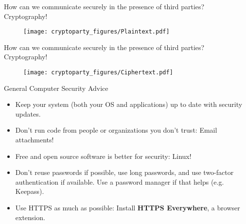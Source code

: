\documentclass{beamer}
\begin{document}
\begin{frame}{How can we communicate securely in the presence of third parties? Cryptography!}

\begin{figure}
\centering
\texttt{[image: cryptoparty\_figures/Plaintext.pdf]}
\end{figure}

\end{frame}
\begin{frame}{How can we communicate securely in the presence of third parties? Cryptography!}

\begin{figure}
\centering
\texttt{[image: cryptoparty\_figures/Ciphertext.pdf]}
\end{figure}

\end{frame}

\begin{frame}{General Computer Security Advice}

\begin{itemize}
   \item<1-> Keep your system (both your OS and applications) up to date with security updates.
   \item<2-> Don't run code from people or organizations you don't trust: Email attachments!
   \item<3-> Free and open source software is better for security: Linux!
   \item<4-> Don't reuse passwords if possible, use long passwords, and use two-factor authentication if available. Use a password manager if that helps (e.g. Keepass).
   \item<5-> Use HTTPS as much as possible: Install \textbf{HTTPS Everywhere}, a browser extension.
\end{itemize}
\end{frame}
\end{document}

